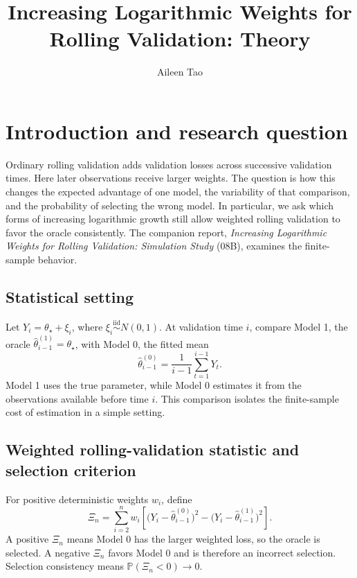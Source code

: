 \documentclass[11pt]{article}
\title{Increasing Logarithmic Weights for Rolling Validation: Theory}
\author{Aileen Tao}
\date{}
\begin{document}
\maketitle

\section{Introduction and research question}

Ordinary rolling validation adds validation losses across successive
validation times.  Here later observations receive larger weights.  The
question is how this changes the expected advantage of one model, the
variability of that comparison, and the probability of selecting the wrong
model.  In particular, we ask which forms of increasing logarithmic growth
still allow weighted rolling validation to favor the oracle consistently.
The companion report, \emph{Increasing Logarithmic Weights for Rolling
Validation: Simulation Study} (08B), examines the finite-sample behavior.

\subsection{Statistical setting}

Let $Y_i=\theta_\star+\xi_i$, where
$\xi_i\stackrel{\mathrm{iid}}{\sim}N(0,1)$.  At validation time $i$, compare
Model 1, the oracle $\widehat\theta_{i-1}^{(1)}=\theta_\star$, with Model 0,
the fitted mean
\[
\widehat\theta_{i-1}^{(0)}=\frac{1}{i-1}\sum_{t=1}^{i-1}Y_t.
\]
Model 1 uses the true parameter, while Model 0 estimates it from the
observations available before time $i$.  This comparison isolates the
finite-sample cost of estimation in a simple setting.

\subsection{Weighted rolling-validation statistic and selection criterion}

For positive deterministic weights $w_i$, define
\begin{equation}
\Xi_n=\sum_{i=2}^n w_i\left[
\bigl(Y_i-\widehat\theta_{i-1}^{(0)}\bigr)^2
-\bigl(Y_i-\widehat\theta_{i-1}^{(1)}\bigr)^2\right].
\label{eq:statistic}
\end{equation}
A positive $\Xi_n$ means Model 0 has the larger weighted loss, so the oracle
is selected.  A negative $\Xi_n$ favors Model 0 and is therefore an incorrect
selection.  Selection consistency means $\mathbb P(\Xi_n<0)\to0$.
\end{document}
